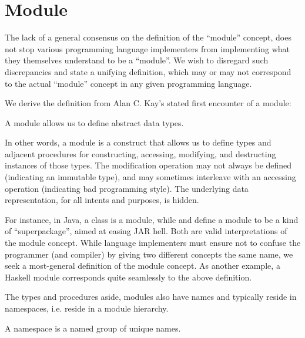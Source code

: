 \section{Module}

The lack of a general consensus on the definition of the ``module'' concept,
does not stop various programming language implementers from implementing what
they themselves understand to be a ``module''\cite{list-of-modular-pls}. We
wish to disregard such discrepancies and state a unifying definition, which may
or may not correspond to the actual ``module'' concept in any given programming
language.

We derive the definition from Alan C. Kay's stated first encounter of a
module\cite[I. 1960-66--Early OOP and other formative ideas of the
sixties]{smalltalk}:

\begin{definition} A module allows us to define abstract data
types.\end{definition}

In other words, a module is a construct that allows us to define types and
adjacent procedures for constructing, accessing, modifying, and destructing
instances of those types. The modification operation may not always be defined
(indicating an immutable type), and may sometimes interleave with an accessing
operation (indicating bad programming style). The underlying data
representation, for all intents and purposes, is hidden.

For instance, in Java, a class is a module, while \cite{jsr-277} and
\cite{jsr-294} define a module to be a kind of ``superpackage'', aimed at
easing JAR hell\footnotemark. Both are valid interpretations of the module
concept. While language implementers must ensure not to confuse the programmer
(and compiler) by giving two different concepts the same name, we seek a
most-general definition of the module concept. As another example, a Haskell
module corresponds quite seamlessly to the above definition. 


The types and procedures aside, modules also have names and typically reside in
namespaces, i.e. reside in a module hierarchy.

\begin{definition}
A namespace is a named group of unique names.
\end{definition}

